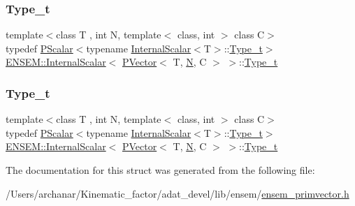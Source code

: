 \subsubsection{\texorpdfstring{Type\_t}{Type\_t}\hspace{0.1cm}{\footnotesize\ttfamily [1/2]}}
{\footnotesize\ttfamily template$<$class T , int N, template$<$ class, int $>$ class C$>$ \\
typedef \mbox{\hyperlink{classENSEM_1_1PScalar}{P\+Scalar}}$<$typename \mbox{\hyperlink{structENSEM_1_1InternalScalar}{Internal\+Scalar}}$<$T$>$\+::\mbox{\hyperlink{structENSEM_1_1InternalScalar_3_01PVector_3_01T_00_01N_00_01C_01_4_01_4_a3d48341b473eb19411a82b36c48559cc}{Type\+\_\+t}}$>$ \mbox{\hyperlink{structENSEM_1_1InternalScalar}{E\+N\+S\+E\+M\+::\+Internal\+Scalar}}$<$ \mbox{\hyperlink{classENSEM_1_1PVector}{P\+Vector}}$<$ T, \mbox{\hyperlink{operator__name__util_8cc_a7722c8ecbb62d99aee7ce68b1752f337}{N}}, C $>$ $>$\+::\mbox{\hyperlink{structENSEM_1_1InternalScalar_3_01PVector_3_01T_00_01N_00_01C_01_4_01_4_a3d48341b473eb19411a82b36c48559cc}{Type\+\_\+t}}}

\mbox{\label{structENSEM_1_1InternalScalar_3_01PVector_3_01T_00_01N_00_01C_01_4_01_4_a3d48341b473eb19411a82b36c48559cc}} 
\subsubsection{\texorpdfstring{Type\_t}{Type\_t}\hspace{0.1cm}{\footnotesize\ttfamily [2/2]}}
{\footnotesize\ttfamily template$<$class T , int N, template$<$ class, int $>$ class C$>$ \\
typedef \mbox{\hyperlink{classENSEM_1_1PScalar}{P\+Scalar}}$<$typename \mbox{\hyperlink{structENSEM_1_1InternalScalar}{Internal\+Scalar}}$<$T$>$\+::\mbox{\hyperlink{structENSEM_1_1InternalScalar_3_01PVector_3_01T_00_01N_00_01C_01_4_01_4_a3d48341b473eb19411a82b36c48559cc}{Type\+\_\+t}}$>$ \mbox{\hyperlink{structENSEM_1_1InternalScalar}{E\+N\+S\+E\+M\+::\+Internal\+Scalar}}$<$ \mbox{\hyperlink{classENSEM_1_1PVector}{P\+Vector}}$<$ T, \mbox{\hyperlink{operator__name__util_8cc_a7722c8ecbb62d99aee7ce68b1752f337}{N}}, C $>$ $>$\+::\mbox{\hyperlink{structENSEM_1_1InternalScalar_3_01PVector_3_01T_00_01N_00_01C_01_4_01_4_a3d48341b473eb19411a82b36c48559cc}{Type\+\_\+t}}}



The documentation for this struct was generated from the following file\+:\begin{DoxyCompactItemize}
\item 
/\+Users/archanar/\+Kinematic\+\_\+factor/adat\+\_\+devel/lib/ensem/\mbox{\hyperlink{lib_2ensem_2ensem__primvector_8h}{ensem\+\_\+primvector.\+h}}\end{DoxyCompactItemize}
